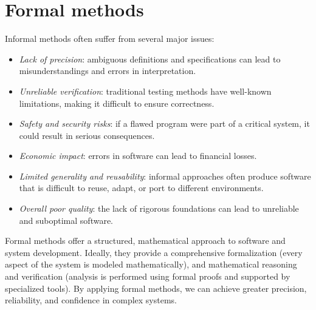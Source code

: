 \section{Formal methods}

Informal methods often suffer from several major issues:
\begin{itemize}
    \item \textit{Lack of precision}: ambiguous definitions and specifications can lead to misunderstandings and errors in interpretation.
    \item \textit{Unreliable verification}: traditional testing methods have well-known limitations, making it difficult to ensure correctness.
    \item \textit{Safety and security risks}: if a flawed program were part of a critical system, it could result in serious consequences.
    \item \textit{Economic impact}: errors in software can lead to financial losses.
    \item \textit{Limited generality and reusability}: informal approaches often produce software that is difficult to reuse, adapt, or port to different environments.
    \item \textit{Overall poor quality}: the lack of rigorous foundations can lead to unreliable and suboptimal software.
\end{itemize}
\noindent Formal methods offer a structured, mathematical approach to software and system development. 
Ideally, they provide a comprehensive formalization (every aspect of the system is modeled mathematically), and mathematical reasoning and verification (analysis is performed using formal proofs and supported by specialized tools).
By applying formal methods, we can achieve greater precision, reliability, and confidence in complex systems.